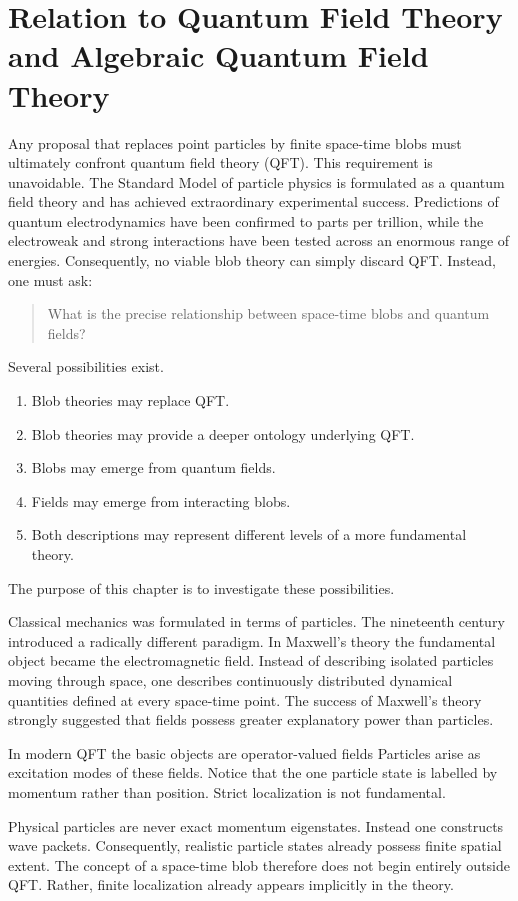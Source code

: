 \section{Relation to Quantum Field Theory and Algebraic Quantum Field Theory}
Any proposal that replaces point particles by finite space-time blobs must
ultimately confront quantum field theory (QFT).
This requirement is unavoidable.
The Standard Model of particle physics is formulated as a quantum field
theory and has achieved extraordinary experimental success. Predictions
of quantum electrodynamics have been confirmed to parts per trillion,
while the electroweak and strong interactions have been tested across an
enormous range of energies.
Consequently, no viable blob theory can simply discard QFT.
Instead, one must ask:
\begin{quote}
What is the precise relationship between space-time blobs and quantum
fields?
\end{quote}
Several possibilities exist.
\begin{enumerate}
\item Blob theories may replace QFT.
\item Blob theories may provide a deeper ontology underlying QFT.
\item Blobs may emerge from quantum fields.
\item Fields may emerge from interacting blobs.
\item Both descriptions may represent different levels of a more
fundamental theory.
\end{enumerate}
The purpose of this chapter is to investigate these possibilities.

Classical mechanics was formulated in terms of particles.
The nineteenth century introduced a radically different paradigm.
In Maxwell's theory the fundamental object became the electromagnetic
field.
Instead of describing isolated particles moving through space, one
describes continuously distributed dynamical quantities defined at every
space-time point.
The success of Maxwell's theory strongly suggested that fields possess
greater explanatory power than particles.

In modern QFT the basic objects are operator-valued fields
Particles arise as excitation modes of these fields.
Notice that the one particle state is labelled by momentum rather than position.
Strict localization is not fundamental.

Physical particles are never exact momentum eigenstates.
Instead one constructs wave packets.
Consequently, realistic particle states already possess finite spatial
extent.
The concept of a space-time blob therefore does not begin entirely
outside QFT.
Rather, finite localization already appears implicitly in the theory.

